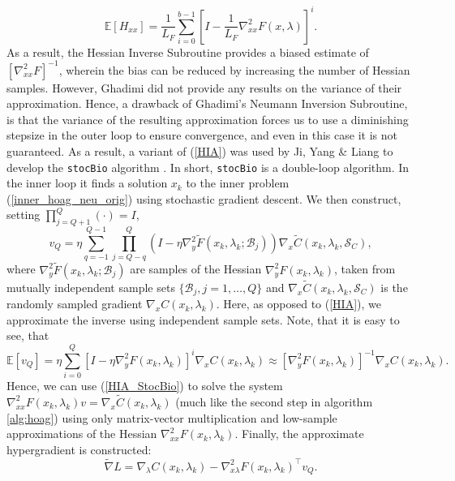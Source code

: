 \documentclass[11pt, twoside]{report}
\begin{document}
\[\mathbb{E}[H_{xx}] = \frac{1}{L_F} \sum_{i=0}^{b-1}\left[I-\frac{1}{L_F} \nabla^2_{xx} F(x,\lambda)\right]^i.\]
As a result, the Hessian Inverse Subroutine provides a biased estimate of $[\nabla_{xx}^2 F]^{-1}$, wherein the bias can be reduced by increasing the number of Hessian samples. However, Ghadimi did not provide any results on the variance of their approximation. Hence, a drawback of Ghadimi's Neumann Inversion Subroutine, is that the variance of the resulting approximation forces us to use a diminishing stepsize in the outer loop to ensure convergence, and even in this case it is not guaranteed. As a result, a variant of (\ref{HIA}) was used by Ji, Yang \& Liang to develop the \texttt{stocBio} algorithm \cite{ji2021bilevel}. In short, \texttt{stocBio} is a double-loop algorithm. In the inner loop it finds a solution $x_k$ to the inner problem (\ref{inner_hoag_neu_orig}) using stochastic gradient descent. We then construct, setting $\prod_{j=Q+1}^Q(\cdot) = I$,
\begin{equation} \label{HIA_StocBio}
    v_Q= \eta \sum_{q=-1}^{Q-1} \prod_{j=Q-q}^Q\left(I- \eta \nabla_y^2 \tilde{F}\left(x_k, \lambda_k ; \mathcal{B}_j\right)\right) \nabla_x \tilde{C}(x_k,\lambda_k,\mathcal{S}_C),
\end{equation}
where $\nabla_y^2 \tilde{F}\left(x_k, \lambda_k ; \mathcal{B}_j\right)$ are samples of the Hessian $\nabla_y^2 F \left(x_k, \lambda_k\right)$, taken from mutually independent sample sets $\{\mathcal{B}_j, j = 1, \hdots, Q\}$ and $\nabla_x \tilde{C}(x_k,\lambda_k,\mathcal{S}_C)$ is the randomly sampled gradient $\nabla_x C(x_k,\lambda_k)$. Here, as opposed to (\ref{HIA}), we approximate the inverse using independent sample sets. Note, that it is easy to see, that
\[\mathbb{E}[v_Q] = \eta \sum_{i=0}^{Q} \left[I - \eta\nabla_y^2 F \left(x_k, \lambda_k\right)\right]^i\nabla_x C(x_k,\lambda_k) \approx [\nabla_y^2 F \left(x_k, \lambda_k\right)]^{-1}\nabla_x C(x_k,\lambda_k).\]
Hence, we can use (\ref{HIA_StocBio}) to solve the system $\nabla_{xx}^2 F(x_k,\lambda_k)v = \nabla_x \tilde{C}(x_k,\lambda_k)$ (much like the second step in algorithm \ref{alg:hoag}) using only matrix-vector multiplication and low-sample approximations of the Hessian $\nabla_{xx}^2 F(x_k,\lambda_k)$. Finally, the approximate hypergradient is constructed:
\[\tilde{\nabla} L = \nabla_\lambda C(x_k,\lambda_k) - \nabla_{x \lambda}^2 F(x_k,\lambda_k)^\top v_Q.\]
\end{document}
